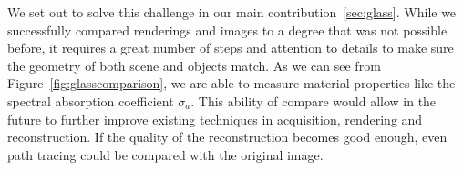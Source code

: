 We set out to solve this challenge in our main contribution~\ref{sec:glass}. While we successfully compared renderings and images to a degree that was not possible before, it requires a great number of steps and attention to details to make sure the geometry of both scene and objects match. As we can see from Figure~\ref{fig:glasscomparison}, we are able to measure material properties like the spectral absorption coefficient $\sigma_a$. This ability of compare would allow in the future to further improve existing techniques in acquisition, rendering and reconstruction. If the quality of the reconstruction becomes good enough, even path tracing could be compared with the original image.


